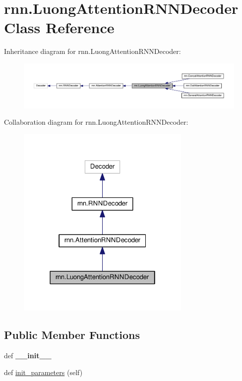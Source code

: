 \hypertarget{classrnn_1_1LuongAttentionRNNDecoder}{}\section{rnn.\+Luong\+Attention\+R\+N\+N\+Decoder Class Reference}
\label{classrnn_1_1LuongAttentionRNNDecoder}


Inheritance diagram for rnn.\+Luong\+Attention\+R\+N\+N\+Decoder\+:
\nopagebreak
\begin{figure}[H]
\begin{center}
\leavevmode
\includegraphics[width=350pt]{classrnn_1_1LuongAttentionRNNDecoder__inherit__graph}
\end{center}
\end{figure}


Collaboration diagram for rnn.\+Luong\+Attention\+R\+N\+N\+Decoder\+:
\nopagebreak
\begin{figure}[H]
\begin{center}
\leavevmode
\includegraphics[width=238pt]{classrnn_1_1LuongAttentionRNNDecoder__coll__graph}
\end{center}
\end{figure}
\subsection*{Public Member Functions}
\begin{DoxyCompactItemize}
\item 
def {\bfseries \+\_\+\+\_\+init\+\_\+\+\_\+}\hypertarget{classrnn_1_1LuongAttentionRNNDecoder_adb0e81a64d832a59a658bf7980c6b0d9}{}\label{classrnn_1_1LuongAttentionRNNDecoder_adb0e81a64d832a59a658bf7980c6b0d9}

\item 
def \hyperlink{classrnn_1_1LuongAttentionRNNDecoder_a83e3361b531de2b9cbf2a6d775b6a350}{init\+\_\+parameters} (self)
\end{DoxyCompactItemize}
